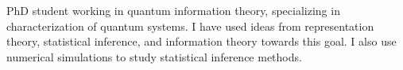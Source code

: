 

\begin{cvparagraph}

PhD student working in quantum information theory, specializing in
characterization of quantum systems. I have used ideas from representation theory, statistical inference, and information theory towards this goal. I also use numerical simulations to study statistical inference methods.
\end{cvparagraph}
